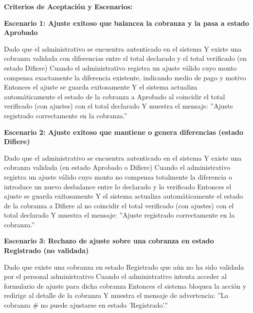 \documentclass[a4paper,9pt]{article}
\begin{document}
\begin{tcolorbox}[hucard, title={\textbf{HU-58: AJUSTAR COBRANZA} \hfill \scriptsize \colorbox{bluestatus}{\textbf{\ New\ }} \quad \colorbox{white}{\textcolor{primarydark}{\textbf{\ 5 pts\ }}}}]
{\begin{itemize}[leftmargin=12pt, nosep, itemsep=1.5pt, topsep=1pt]
\end{itemize}
}\par\vspace{3pt}
\noindent\textbf{\footnotesize Criterios de Aceptación y Escenarios:}\par\vspace{2pt}
{\footnotesize
\noindent\textbf{\textcolor{secondarydark}{Escenario 1:  Ajuste exitoso que balancea la cobranza y la pasa a estado Aprobado}}\par\vspace{1pt}
Dado que el administrativo se encuentra autenticado en el sistema Y existe una cobranza validada con diferencias entre el total declarado y el total verificado (en estado Difiere) Cuando el administrativo registra un ajuste válido cuyo monto compensa exactamente la diferencia existente, indicando medio de pago y motivo Entonces el ajuste se guarda exitosamente Y el sistema actualiza automáticamente el estado de la cobranza a Aprobado al coincidir el total verificado (con ajustes) con el total declarado Y muestra el mensaje: ''Ajuste registrado correctamente en la cobranza.''\par\vspace{2.5pt}
\noindent\textbf{\textcolor{secondarydark}{Escenario 2:  Ajuste exitoso que mantiene o genera diferencias (estado Difiere)}}\par\vspace{1pt}
Dado que el administrativo se encuentra autenticado en el sistema Y existe una cobranza validada (en estado Aprobado o Difiere) Cuando el administrativo registra un ajuste válido cuyo monto no compensa totalmente la diferencia o introduce un nuevo desbalance entre lo declarado y lo verificado Entonces el ajuste se guarda exitosamente Y el sistema actualiza automáticamente el estado de la cobranza a Difiere al no coincidir el total verificado (con ajustes) con el total declarado Y muestra el mensaje: ''Ajuste registrado correctamente en la cobranza.''\par\vspace{2.5pt}
\noindent\textbf{\textcolor{secondarydark}{Escenario 3:  Rechazo de ajuste sobre una cobranza en estado Registrado (no validada)}}\par\vspace{1pt}
Dado que existe una cobranza en estado Registrado que aún no ha sido validada por el personal administrativo Cuando el administrativo intenta acceder al formulario de ajuste para dicha cobranza Entonces el sistema bloquea la acción y redirige al detalle de la cobranza Y muestra el mensaje de advertencia: ''La cobranza \# no puede ajustarse en estado 'Registrado'.''\par\vspace{2.5pt}
}
\end{tcolorbox}
\end{document}
